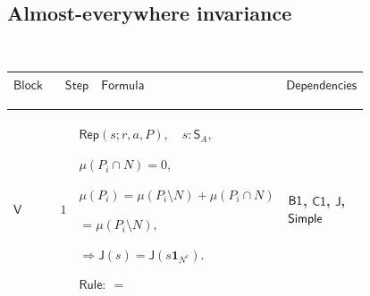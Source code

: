 \documentclass[12pt,reqno]{amsart}
\theoremstyle{blueplain}
\numberwithin{equation}{section}
\newlength{\DCTOneColumnBody}
\begin{document}
{\scriptsize \ }

\subsection{\protect\scriptsize Almost-everywhere invariance}

{\scriptsize {\ }}

{\scriptsize \setlength{\parskip}{0pt}\nointerlineskip
\noindent 
\begin{tabular}{|@{}>{\centering\arraybackslash}m{\DCTOneColumnBody}|}
\hline
$\displaystyle \mathsf{AENonnegativeIntegrals}$ \\ \hline
\end{tabular}%
}

{\scriptsize \setlength{\parskip}{0pt}\nointerlineskip
\noindent 
\begin{tabular}{|@{}>{\centering\arraybackslash}m{0.10658\linewidth}|>{\centering\arraybackslash}m{0.03553\linewidth}|>{\centering\arraybackslash}m{0.52105\linewidth}|>{\centering\arraybackslash}m{0.23684\linewidth}|}
\hline
$\displaystyle \mathsf{Block}$ & $\displaystyle \mathsf{Step}$ & $%
\displaystyle \mathsf{Formula}$ & $\displaystyle \mathsf{Dependencies}$ \\ 
\hline
\end{tabular}%
}

{\scriptsize \setlength{\parskip}{0pt}\nointerlineskip
\noindent 
\begin{tabular}{|@{}>{\centering\arraybackslash}m{\DCTOneColumnBody}|}
\hline
$\displaystyle \mathsf{Context\_V}:=$\par$\displaystyle \mathsf{Null}%
(N),\quad h,v:\mathsf{F},$\par$\displaystyle \forall x\notin N,\ h(x)=v(x).$
\\ \hline
\end{tabular}%
}

{\scriptsize \setlength{\parskip}{0pt}\nointerlineskip
\noindent 
\begin{tabular}{|@{}>{\centering\arraybackslash}m{0.10658\linewidth}|>{\centering\arraybackslash}m{0.03553\linewidth}|>{\centering\arraybackslash}m{0.52105\linewidth}|>{\centering\arraybackslash}m{0.23684\linewidth}|}
\hline
\hypertarget{dct:V1}{$\displaystyle \mathsf{V}$} & $\displaystyle 1$ & $%
\displaystyle \mathsf{Rep}(s;r,a,P),\quad s:\mathsf{S}_A,$\par$\displaystyle %
\mu(P_i\cap N)=0,$\par$\displaystyle \mu(P_i)=\mu(P_i\setminus
N)+\mu(P_i\cap N)$\par$\displaystyle {}=\mu(P_i\setminus N),$\par$%
\displaystyle \Rightarrow\mathsf{J}(s)=\mathsf{J}(s\mathbf{1}_{N^c}).$\par$%
\displaystyle \mathsf{Rule}:\ =$ & \hyperlink{dct:B1}{$\displaystyle \mathsf{%
B1}$}, \hyperlink{proof:C1}{$\displaystyle \mathsf{C1}$}, \hyperlink{def:J}{$%
\displaystyle \mathsf{J}$}, \hyperlink{lem:Simple}{$\displaystyle \mathsf{%
Simple}$} \\ \hline
\end{tabular}%
}
\end{document}
